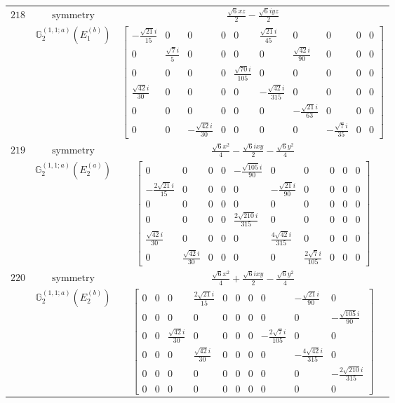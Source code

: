 \documentclass[fleqn,8pt,landscape]{jsarticle}
\begin{document}
\begin{longtable}{ccc}
$ 218 $ & $ \text{symmetry} $ & $ \frac{\sqrt{6} x z}{2} - \frac{\sqrt{6} i y z}{2} $ \\
$  $ & $ \mathbb{G}_{2}^{(1,1;a)}(E_{1}^{(b)}) $ & $ \begin{bmatrix} - \frac{\sqrt{21} i}{15} & 0 & 0 & 0 & 0 & \frac{\sqrt{21} i}{45} & 0 & 0 & 0 & 0 \\ 0 & \frac{\sqrt{7} i}{5} & 0 & 0 & 0 & 0 & \frac{\sqrt{42} i}{90} & 0 & 0 & 0 \\ 0 & 0 & 0 & 0 & \frac{\sqrt{70} i}{105} & 0 & 0 & 0 & 0 & 0 \\ \frac{\sqrt{42} i}{30} & 0 & 0 & 0 & 0 & - \frac{\sqrt{42} i}{315} & 0 & 0 & 0 & 0 \\ 0 & 0 & 0 & 0 & 0 & 0 & - \frac{\sqrt{21} i}{63} & 0 & 0 & 0 \\ 0 & 0 & - \frac{\sqrt{42} i}{30} & 0 & 0 & 0 & 0 & - \frac{\sqrt{7} i}{35} & 0 & 0 \end{bmatrix} $ \\ \hline
$ 219 $ & $ \text{symmetry} $ & $ \frac{\sqrt{6} x^{2}}{4} - \frac{\sqrt{6} i x y}{2} - \frac{\sqrt{6} y^{2}}{4} $ \\
$  $ & $ \mathbb{G}_{2}^{(1,1;a)}(E_{2}^{(a)}) $ & $ \begin{bmatrix} 0 & 0 & 0 & 0 & - \frac{\sqrt{105} i}{90} & 0 & 0 & 0 & 0 & 0 \\ - \frac{2 \sqrt{21} i}{15} & 0 & 0 & 0 & 0 & - \frac{\sqrt{21} i}{90} & 0 & 0 & 0 & 0 \\ 0 & 0 & 0 & 0 & 0 & 0 & 0 & 0 & 0 & 0 \\ 0 & 0 & 0 & 0 & \frac{2 \sqrt{210} i}{315} & 0 & 0 & 0 & 0 & 0 \\ \frac{\sqrt{42} i}{30} & 0 & 0 & 0 & 0 & \frac{4 \sqrt{42} i}{315} & 0 & 0 & 0 & 0 \\ 0 & \frac{\sqrt{42} i}{30} & 0 & 0 & 0 & 0 & \frac{2 \sqrt{7} i}{105} & 0 & 0 & 0 \end{bmatrix} $ \\ \hline
$ 220 $ & $ \text{symmetry} $ & $ \frac{\sqrt{6} x^{2}}{4} + \frac{\sqrt{6} i x y}{2} - \frac{\sqrt{6} y^{2}}{4} $ \\
$  $ & $ \mathbb{G}_{2}^{(1,1;a)}(E_{2}^{(b)}) $ & $ \begin{bmatrix} 0 & 0 & 0 & \frac{2 \sqrt{21} i}{15} & 0 & 0 & 0 & 0 & - \frac{\sqrt{21} i}{90} & 0 \\ 0 & 0 & 0 & 0 & 0 & 0 & 0 & 0 & 0 & - \frac{\sqrt{105} i}{90} \\ 0 & 0 & \frac{\sqrt{42} i}{30} & 0 & 0 & 0 & 0 & - \frac{2 \sqrt{7} i}{105} & 0 & 0 \\ 0 & 0 & 0 & \frac{\sqrt{42} i}{30} & 0 & 0 & 0 & 0 & - \frac{4 \sqrt{42} i}{315} & 0 \\ 0 & 0 & 0 & 0 & 0 & 0 & 0 & 0 & 0 & - \frac{2 \sqrt{210} i}{315} \\ 0 & 0 & 0 & 0 & 0 & 0 & 0 & 0 & 0 & 0 \end{bmatrix} $ \\ \hline

\end{longtable}
\end{document}

